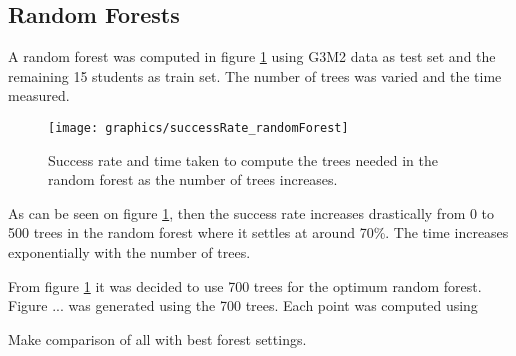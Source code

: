 \subsection{Random Forests}

A random forest was computed in figure \ref{fig:success_time_vs_trees_randomForest} using G3M2 data as test set and the remaining 15 students as train set.
The number of trees was varied and the time measured.

\begin{figure}[H]
\centering
\texttt{[image: graphics/successRate\_randomForest]}
\caption{Success rate and time taken to compute the trees needed in the random forest as the number of trees increases.}
\label{fig:success_time_vs_trees_randomForest}
\end{figure}

As can be seen on figure \ref{fig:success_time_vs_trees_randomForest}, then the success rate increases drastically from 0 to 500 trees in the random forest where it settles at around 70\%.
The time increases exponentially with the number of trees.

From figure \ref{fig:success_time_vs_trees_randomForest} it was decided to use 700 trees for the optimum random forest.
Figure ... was generated using the 700 trees.
Each point was computed using 


\Huge{Make comparison of all with best forest settings.}